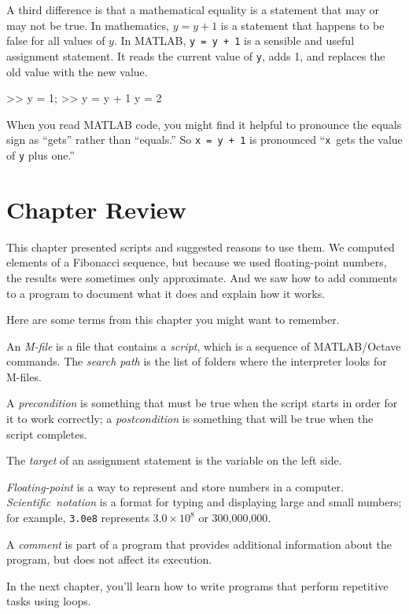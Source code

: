 A third difference is that a mathematical equality is a statement that
may or may not be true.  In mathematics, $y = y+1$ is a statement that
happens to be false for all values of $y$.
In MATLAB, \lstinline{y = y + 1} is a sensible and useful assignment statement.
It reads the current value of \lstinline{y}, adds 1, and replaces the old value with the new value.

\begin{code}
>> y = 1;
>> y = y + 1
y = 2
\end{code}

When you read MATLAB code, you might find it helpful to pronounce
the equals sign as ``gets'' rather than ``equals.''  So \lstinline{x = y + 1}
is pronounced ``\lstinline{x}~gets the value of \lstinline{y} plus one.''

\section{Chapter Review}

This chapter presented scripts and suggested reasons to use them.  We computed elements of a Fibonacci sequence, but because we used floating-point numbers, the results were sometimes only approximate.
And we saw how to add comments to a program to document what it does and explain how it works.

Here are some terms from this chapter you might want to remember.

An \emph{M-file} is a file that contains a \emph{script}, which is a sequence of MATLAB/Octave commands.
The \emph{search path} is the list of folders where the interpreter looks for
M-files.

A \emph{precondition} is something that must be true when the script
starts in order for it to work correctly; a \emph{postcondition} is something that will be true when the script completes.

The \emph{target} of an assignment statement is the variable on the left side.

\emph{Floating-point} is a way to represent and store numbers in a computer.
\mbox{\emph{Scientific notation}} is a format for typing and displaying large
and small numbers; for example, \lstinline{3.0e8} represents $3.0 \times 10^8$
or 300,000,000.

A \emph{comment} is part of a program that provides additional information
about the program, but does not affect its execution.

In the next chapter, you'll learn how to write programs that perform repetitive tasks using loops.


